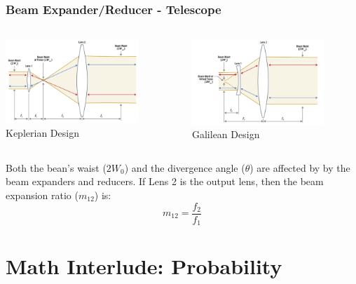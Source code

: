 \documentclass{beamer}
\begin{document}
\begin{frame}\frametitle{Beam Expander/Reducer - Telescope}
\begin{columns}
\begin{column}{5.5cm}
\begin{center}
\includegraphics[width=5cm]{fig/beamXkepler.png}
Keplerian Design
\end{center}
\end{column}
\begin{column}{5.5cm}
\begin{center}
\includegraphics[width=5cm]{fig/beamXgalileo.png}
Galilean Design
\end{center}
\end{column}
\end{columns}

\vspace{0.25cm}
Both the bean's waist ($2W_0$) and the divergence angle ($\theta$) are affected by by the beam expanders and reducers. If Lens 2 is the output lens, then the beam expansion ratio ($m_{12}$) is: 
\begin{equation}
m_{12} = \frac{f_2}{f_1}
\end{equation}

\end{frame}



\section{Math Interlude: Probability}
\end{document}
